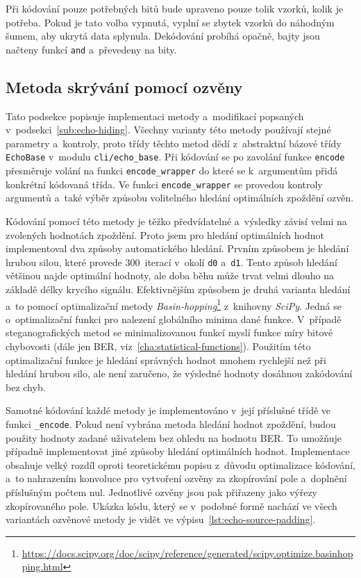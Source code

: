 Při kódování pouze potřebných bitů bude upraveno pouze tolik vzorků, kolik je
potřeba. Pokud je tato volba vypnutá, vyplní se zbytek vzorků do náhodným
šumem, aby ukrytá data splynula. Dekódování probíhá opačně, bajty jsou načteny
funkcí \texttt{and} a~převedeny na bity.

\subsection*{Metoda skrývání pomocí ozvěny}
\label{sub:echo-hiding-implementation}

Tato podsekce popisuje implementaci metody a~modifikací popsaných
v~podsekci~\ref{sub:echo-hiding}. Všechny varianty této metody používají stejné
parametry a~kontroly, proto třídy těchto metod dědí z~abstraktní bázové třídy
\texttt{EchoBase} v~modulu \texttt{cli/echo\_base}. Při kódování se po zavolání
funkce \texttt{encode} přesměruje volání na funkci \texttt{encode\_wrapper} do
které se k~argumentům přidá konkrétní kódovaná třída. Ve funkci
\texttt{encode\_wrapper} se provedou kontroly argumentů a~také výběr způsobu
volitelného hledání optimálních zpoždění ozvěn.

Kódování pomocí této metody je těžko předvídatelné a~výsledky závisí velmi na
zvolených hodnotách zpoždění. Proto jsem pro hledání optimálních hodnot
implementoval dva způsoby automatického hledání. Prvním způsobem je hledání
hrubou silou, které provede 300~iterací v~okolí \texttt{d0} a~\texttt{d1}.
Tento způsob hledání většinou najde optimální hodnoty, ale doba běhu může trvat
velmi dlouho na základě délky krycího signálu. Efektivnějším způsobem je druhá
varianta hledání a~to pomocí optimalizační metody
\textit{Basin-hopping}\footnote{\url{https://docs.scipy.org/doc/scipy/reference/generated/scipy.optimize.basinhopping.html}}
z~knihovny \textit{SciPy}. Jedná se o~optimalizační funkci pro nalezení
globálního minima dané funkce. V~případě steganografických metod se
minimalizovanou funkcí myslí funkce míry bitové chybovosti (dále jen BER,
viz~\ref{cha:statistical-functions}). Použitím této optimalizační funkce je
hledání správných hodnot mnohem rychlejší než při hledání hrubou silo, ale není
zaručeno, že výsledné hodnoty dosáhnou zakódování bez chyb.

Samotné kódování každé metody je implementováno v~její příslušné třídě ve
funkci \texttt{\_encode}. Pokud není vybrána metoda hledání hodnot zpoždění,
budou použity hodnoty zadané uživatelem bez ohledu na hodnotu BER. To umožňuje
případně implementovat jiné způsoby hledání optimálních hodnot. Implementace
obsahuje velký rozdíl oproti teoretickému popisu z~důvodu optimalizace
kódování, a~to nahrazením konvoluce pro vytvoření ozvěny za zkopírování pole
a~doplnění příslušným počtem nul. Jednotlivé ozvěny jsou pak přiřazeny jako
výřezy zkopírovaného pole. Ukázka kódu, který se v~podobné formě nachází ve
všech variantách ozvěnové metody je vidět ve
výpisu~\ref{lst:echo-source-padding}.

